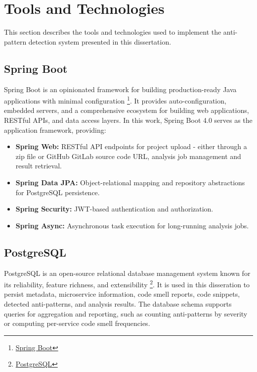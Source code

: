 \section{Tools and Technologies}
\label{sec:tools-and-technologies}

\indent \par This section describes the tools and technologies used to implement the anti-pattern detection system presented in this dissertation.

\subsection{Spring Boot}
\label{subsec:spring-boot}

\indent \par Spring Boot is an opinionated framework for building production-ready Java applications with minimal configuration \footnote{\href{https://spring.io/projects/spring-boot}{Spring Boot}}. It provides auto-configuration, embedded servers, and a comprehensive ecosystem for building web applications, RESTful APIs, and data access layers. In this work, Spring Boot 4.0 serves as the application framework, providing:
\begin{itemize}
    \item \textbf{Spring Web:} RESTful API endpoints for project upload - either through a zip file or GitHub \/ GitLab source code URL, analysis job management and result retrieval.
    \item \textbf{Spring Data JPA:} Object-relational mapping and repository abstractions for PostgreSQL persistence.
    \item \textbf{Spring Security:} JWT-based authentication and authorization.
    \item \textbf{Spring Async:} Asynchronous task execution for long-running analysis jobs.
\end{itemize}

\subsection{PostgreSQL}
\label{subsec:postgresql}

\indent \par PostgreSQL is an open-source relational database management system known for its reliability, feature richness, and extensibility \footnote{\href{https://www.postgresql.org/}{PostgreSQL}}. It is used in this disseration to persist metadata, microservice information, code smell reports, code snippets, detected anti-patterns, and analysis results. The database schema supports queries for aggregation and reporting, such as counting anti-patterns by severity or computing per-service code smell frequencies.

